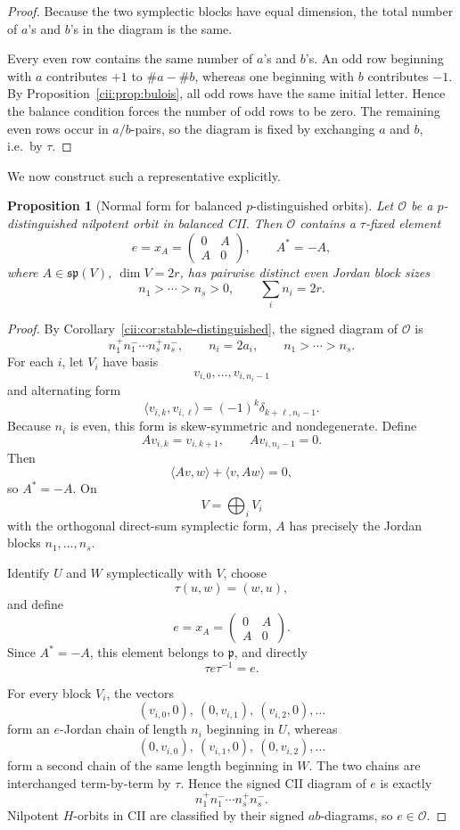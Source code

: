 \documentclass[11pt,reqno]{amsart}
\numberwithin{equation}{section}
\newtheorem{proposition}[theorem]{Proposition}
\theoremstyle{definition}
\theoremstyle{remark}
\begin{document}
\begin{proof}
Because the two symplectic blocks have equal dimension, the total number
of \(a\)'s and \(b\)'s in the diagram is the same.

Every even row contains the same number of \(a\)'s and \(b\)'s.
An odd row beginning with \(a\) contributes \(+1\) to
\(\#a-\#b\), whereas one beginning with \(b\) contributes \(-1\).
By Proposition~\ref{cii:prop:bulois}, all odd rows have the same initial
letter.  Hence the balance condition forces the number of odd rows to be
zero.  The remaining even rows occur in \(a/b\)-pairs, so the diagram is
fixed by exchanging \(a\) and \(b\), i.e.\ by \(\tau\).
\end{proof}

We now construct such a representative explicitly.

\begin{proposition}[Normal form for balanced \(p\)-distinguished orbits]
\label{cii:prop:normal-form}
Let \(\mathcal O\) be a \(p\)-distinguished nilpotent orbit in balanced
CII.  Then \(\mathcal O\) contains a \(\tau\)-fixed element
\[
e=x_A=
\begin{pmatrix}
0&A\\
A&0
\end{pmatrix},
\qquad
A^*=-A,
\]
where \(A\in\mathfrak{sp}(V)\), \(\dim V=2r\), has pairwise distinct even
Jordan block sizes
\[
n_1>\cdots>n_s>0,
\qquad
\sum_i n_i=2r.
\]
\end{proposition}

\begin{proof}
By Corollary~\ref{cii:cor:stable-distinguished}, the signed diagram of
\(\mathcal O\) is
\[
n_1^+n_1^-\cdots n_s^+n_s^-,
\qquad
n_i=2a_i,
\qquad
n_1>\cdots>n_s.
\]
For each \(i\), let \(V_i\) have basis
\[
v_{i,0},\ldots,v_{i,n_i-1}
\]
and alternating form
\[
\langle v_{i,k},v_{i,\ell}\rangle
=
(-1)^k\delta_{k+\ell,n_i-1}.
\]
Because \(n_i\) is even, this form is skew-symmetric and nondegenerate.
Define
\[
Av_{i,k}=v_{i,k+1},
\qquad
Av_{i,n_i-1}=0.
\]
Then
\[
\langle Av,w\rangle+\langle v,Aw\rangle=0,
\]
so \(A^*=-A\).  On
\[
V=\bigoplus_iV_i
\]
with the orthogonal direct-sum symplectic form, \(A\) has precisely the
Jordan blocks \(n_1,\ldots,n_s\).

Identify \(U\) and \(W\) symplectically with \(V\), choose
\[
\tau(u,w)=(w,u),
\]
and define
\[
e=x_A=
\begin{pmatrix}
0&A\\
A&0
\end{pmatrix}.
\]
Since \(A^*=-A\), this element belongs to \(\mathfrak p\), and directly
\[
\tau e\tau^{-1}=e.
\]

For every block \(V_i\), the vectors
\[
(v_{i,0},0),\ (0,v_{i,1}),\ (v_{i,2},0),\ldots
\]
form an \(e\)-Jordan chain of length \(n_i\) beginning in \(U\), whereas
\[
(0,v_{i,0}),\ (v_{i,1},0),\ (0,v_{i,2}),\ldots
\]
form a second chain of the same length beginning in \(W\).  The two chains
are interchanged term-by-term by \(\tau\).  Hence the signed CII diagram
of \(e\) is exactly
\[
n_1^+n_1^-\cdots n_s^+n_s^-.
\]
Nilpotent \(H\)-orbits in CII are classified by their signed
\(ab\)-diagrams, so \(e\in\mathcal O\).
\end{proof}
\end{document}
